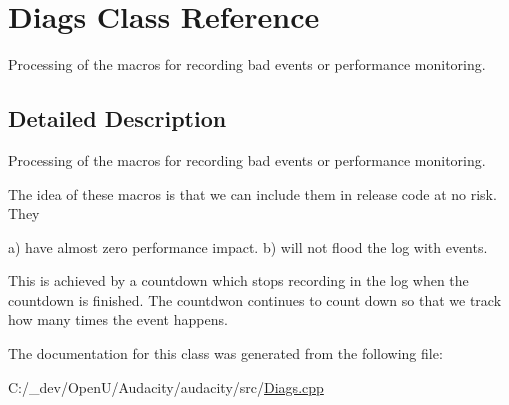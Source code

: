 \hypertarget{class_diags}{}\section{Diags Class Reference}
\label{class_diags}


Processing of the macros for recording bad events or performance monitoring.  




\subsection{Detailed Description}
Processing of the macros for recording bad events or performance monitoring. 

The idea of these macros is that we can include them in release code at no risk. They

a) have almost zero performance impact. b) will not flood the log with events.

This is achieved by a countdown which stops recording in the log when the countdown is finished. The countdwon continues to count down so that we track how many times the event happens. 

The documentation for this class was generated from the following file\+:\begin{DoxyCompactItemize}
\item 
C\+:/\+\_\+dev/\+Open\+U/\+Audacity/audacity/src/\hyperlink{_diags_8cpp}{Diags.\+cpp}\end{DoxyCompactItemize}
